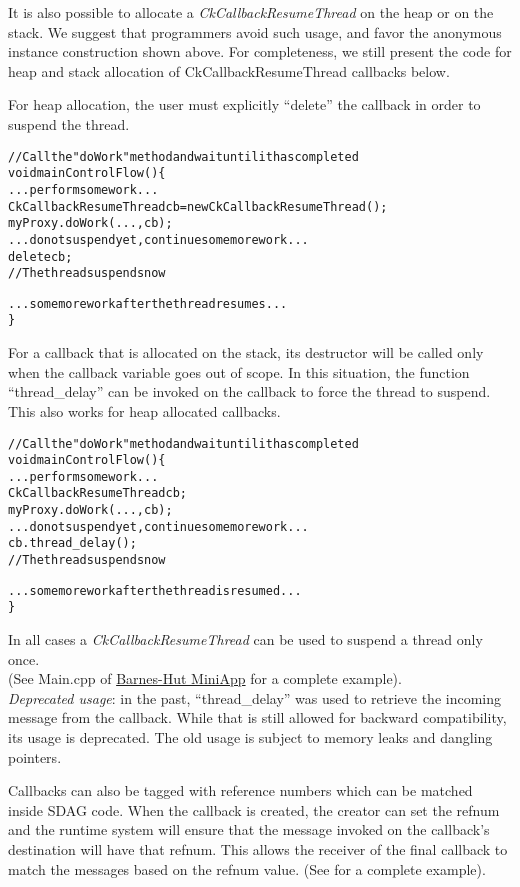 It is also possible to allocate a {\em CkCallbackResumeThread} on the heap or on
the stack. We suggest that programmers avoid such usage, and favor the anonymous instance construction
shown above. For completeness, we still present the code for heap and stack
allocation of CkCallbackResumeThread callbacks below.

For heap allocation, the user must explicitly ``delete'' the callback in order to
suspend the thread.

\begin{alltt}
// Call the "doWork" method and wait until it has completed
void mainControlFlow() \{
  ...perform some work...
  CkCallbackResumeThread cb = new CkCallbackResumeThread();
  myProxy.doWork(...,cb);
  ...do not suspend yet, continue some more work...
  delete cb;
  // The thread suspends now

  ...some more work after the thread resumes...
\}
\end{alltt}

For a callback that is allocated on the stack, its destructor will be called only
when the callback variable goes out of scope. In this
situation, the function ``thread\_delay'' can be invoked on the callback to
force the thread to suspend. This also works for heap allocated callbacks.

\begin{alltt}
// Call the "doWork" method and wait until it has completed
void mainControlFlow() \{
  ...perform some work...
  CkCallbackResumeThread cb;
  myProxy.doWork(...,cb);
  ...do not suspend yet, continue some more work...
  cb.thread\_delay();
  // The thread suspends now

  ...some more work after the thread is resumed...
\}
\end{alltt}

In all cases a {\em CkCallbackResumeThread} can be used to suspend a thread
only once.\\
(See Main.cpp of \href{http://charmplusplus.org/miniApps/#barnes}{Barnes-Hut MiniApp}
for a complete example).\\
{\em Deprecated usage}: in the past, ``thread\_delay'' was used to retrieve the
incoming message from the callback. While that is still allowed for backward
compatibility, its usage is deprecated. The old usage is subject to memory
leaks and dangling pointers.

Callbacks can also be tagged with reference numbers which can be matched inside SDAG code.
When the callback is created, the creator can set the refnum and the runtime system will
ensure that the message invoked on the callback's destination will have that refnum.
This allows the receiver of the final callback to match the messages based on the refnum
value. (See  for a complete example).\\

